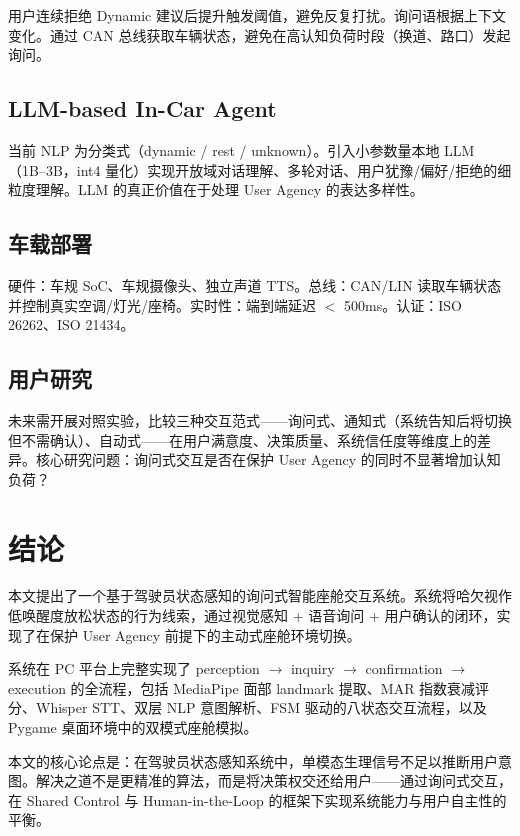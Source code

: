 \documentclass[12pt,a4paper]{ctexart}
\begin{document}
用户连续拒绝 Dynamic 建议后提升触发阈值，避免反复打扰。询问语根据上下文变化。通过 CAN 总线获取车辆状态，避免在高认知负荷时段（换道、路口）发起询问。

\subsection{LLM-based In-Car Agent}

当前 NLP 为分类式（dynamic / rest / unknown）。引入小参数量本地 LLM（1B--3B，int4 量化）实现开放域对话理解、多轮对话、用户犹豫/偏好/拒绝的细粒度理解。LLM 的真正价值在于处理 User Agency 的表达多样性。

\subsection{车载部署}

硬件：车规 SoC、车规摄像头、独立声道 TTS。总线：CAN/LIN 读取车辆状态并控制真实空调/灯光/座椅。实时性：端到端延迟 $<$ 500ms。认证：ISO 26262、ISO 21434。

\subsection{用户研究}

未来需开展对照实验，比较三种交互范式——询问式、通知式（系统告知后将切换但不需确认）、自动式——在用户满意度、决策质量、系统信任度等维度上的差异。核心研究问题：询问式交互是否在保护 User Agency 的同时不显著增加认知负荷？

\section{结论}

本文提出了一个基于驾驶员状态感知的询问式智能座舱交互系统。系统将哈欠视作低唤醒度放松状态的行为线索，通过视觉感知 + 语音询问 + 用户确认的闭环，实现了在保护 User Agency 前提下的主动式座舱环境切换。

系统在 PC 平台上完整实现了 perception $\rightarrow$ inquiry $\rightarrow$ confirmation $\rightarrow$ execution 的全流程，包括 MediaPipe 面部 landmark 提取、MAR 指数衰减评分、Whisper STT、双层 NLP 意图解析、FSM 驱动的八状态交互流程，以及 Pygame 桌面环境中的双模式座舱模拟。

本文的核心论点是：在驾驶员状态感知系统中，单模态生理信号不足以推断用户意图。解决之道不是更精准的算法，而是将决策权交还给用户——通过询问式交互，在 Shared Control 与 Human-in-the-Loop 的框架下实现系统能力与用户自主性的平衡。
\end{document}
